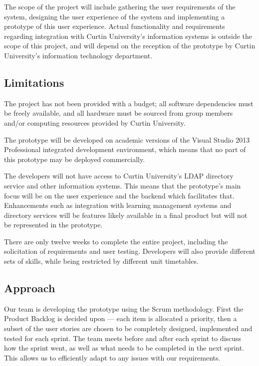 \documentclass[a4paper,titlepage,12pt]{article}
\begin{document}
The scope of the project will include gathering the user requirements of the
system, designing the user experience of the system and implementing a
prototype of this user experience. Actual functionality and requirements
regarding integration with Curtin University's information systems is outside
the scope of this project, and will depend on the reception of the prototype by
Curtin University's information technology department.

\subsection{Limitations}

The project has not been provided with a budget; all software dependencies must
be freely available, and all hardware must be sourced from group members and/or
computing resources provided by Curtin University.

The prototype will be developed on academic versions of the Visual Studio 2013
Professional integrated development environment, which means that no part of
this prototype may be deployed commercially.

The developers will not have access to Curtin University's LDAP directory
service and other information systems. This means that the prototype's main
focus will be on the user experience and the backend which facilitates that.
Enhancements such as integration with learning management systems and directory
services will be features likely available in a final product but will not be
represented in the prototype.

There are only twelve weeks to complete the entire project, including the
solicitation of requirements and user testing. Developers will also provide
different sets of skills, while being restricted by different unit timetables.

\subsection{Approach}

Our team is developing the prototype using the Scrum methodology. First the
Product Backlog is decided upon --- each item is allocated a priority, then
a subset of the user stories are chosen to be completely designed, implemented
and tested for each sprint. The team meets before and after each sprint to
discuss how the sprint went, as well as what needs to be completed in the next
sprint. This allows us to efficiently adapt to any issues with our
requirements.
\end{document}
